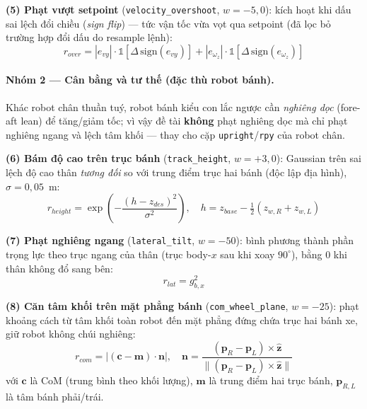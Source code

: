\textbf{(5) Phạt vượt setpoint} (\texttt{velocity\_overshoot}, $w=-5{,}0$):
kích hoạt khi dấu sai lệch đổi chiều (\textit{sign flip}) --- tức vận tốc
vừa vọt qua setpoint (đã lọc bỏ trường hợp đổi dấu do resample lệnh):
\begin{equation}
    r_{over} = |e_{vy}|\cdot\mathbb{1}[\Delta\,\mathrm{sign}(e_{vy})]
             + |e_{\omega_z}|\cdot\mathbb{1}[\Delta\,\mathrm{sign}(e_{\omega_z})]
    \label{eq:rew_overshoot}
\end{equation}

\paragraph{Nhóm 2 --- Cân bằng và tư thế (đặc thù robot bánh).}
Khác robot chân thuần tuý, robot bánh kiểu con lắc ngược cần \emph{nghiêng
dọc} (fore-aft lean) để tăng/giảm tốc; vì vậy đề tài \textbf{không} phạt
nghiêng dọc mà chỉ phạt nghiêng ngang và lệch tâm khối --- thay cho cặp
\texttt{upright}/\texttt{rpy} của robot chân.

\textbf{(6) Bám độ cao trên trục bánh} (\texttt{track\_height}, $w=+3{,}0$):
Gaussian trên sai lệch độ cao thân \emph{tương đối} so với trung điểm trục
hai bánh (độc lập địa hình), $\sigma=0{,}05$~m:
\begin{equation}
    r_{height} = \exp\!\left(-\frac{(h - z_{des})^2}{\sigma^2}\right),
    \quad h = z_{base} - \tfrac{1}{2}\!\left(z_{w,R}+z_{w,L}\right)
    \label{eq:rew_height}
\end{equation}

\textbf{(7) Phạt nghiêng ngang} (\texttt{lateral\_tilt}, $w=-50$): bình
phương thành phần trọng lực theo trục ngang của thân (trục body-$x$ sau khi
xoay $90^\circ$), bằng 0 khi thân không đổ sang bên:
\begin{equation}
    r_{lat} = g_{b,x}^2
    \label{eq:rew_lateral}
\end{equation}

\textbf{(8) Căn tâm khối trên mặt phẳng bánh} (\texttt{com\_wheel\_plane},
$w=-25$): phạt khoảng cách từ tâm khối toàn robot đến mặt phẳng đứng chứa
trục hai bánh xe, giữ robot không chúi nghiêng:
\begin{equation}
    r_{com} = \bigl|(\mathbf{c}-\mathbf{m})\cdot\mathbf{n}\bigr|,\quad
    \mathbf{n}=\frac{(\mathbf{p}_R-\mathbf{p}_L)\times\hat{\mathbf{z}}}
                    {\lVert(\mathbf{p}_R-\mathbf{p}_L)\times\hat{\mathbf{z}}\rVert}
    \label{eq:rew_com}
\end{equation}
với $\mathbf{c}$ là CoM (trung bình theo khối lượng), $\mathbf{m}$ là trung
điểm hai trục bánh, $\mathbf{p}_{R,L}$ là tâm bánh phải/trái.

